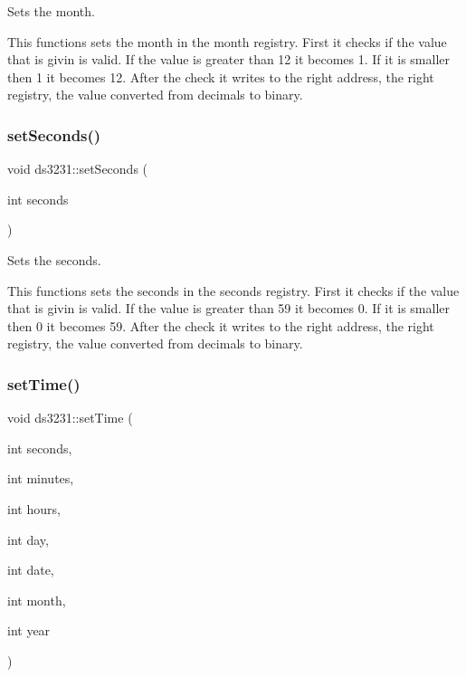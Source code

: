 Sets the month. 

This functions sets the month in the month registry. First it checks if the value that is givin is valid. If the value is greater than 12 it becomes 1. If it is smaller then 1 it becomes 12. After the check it writes to the right address, the right registry, the value converted from decimals to binary. \mbox{\label{classds3231_ae78fad4364f782cc01a23670ffa3a1a4}} 
\subsubsection{\texorpdfstring{set\+Seconds()}{setSeconds()}}
{\footnotesize\ttfamily void ds3231\+::set\+Seconds (\begin{DoxyParamCaption}\item[{int}]{seconds }\end{DoxyParamCaption})\hspace{0.3cm}{\ttfamily [inline]}}



Sets the seconds. 

This functions sets the seconds in the seconds registry. First it checks if the value that is givin is valid. If the value is greater than 59 it becomes 0. If it is smaller then 0 it becomes 59. After the check it writes to the right address, the right registry, the value converted from decimals to binary. \mbox{\label{classds3231_ac53a311085250d36ae88a851a0b9c250}} 
\subsubsection{\texorpdfstring{set\+Time()}{setTime()}}
{\footnotesize\ttfamily void ds3231\+::set\+Time (\begin{DoxyParamCaption}\item[{int}]{seconds,  }\item[{int}]{minutes,  }\item[{int}]{hours,  }\item[{int}]{day,  }\item[{int}]{date,  }\item[{int}]{month,  }\item[{int}]{year }\end{DoxyParamCaption})\hspace{0.3cm}{\ttfamily [inline]}}



